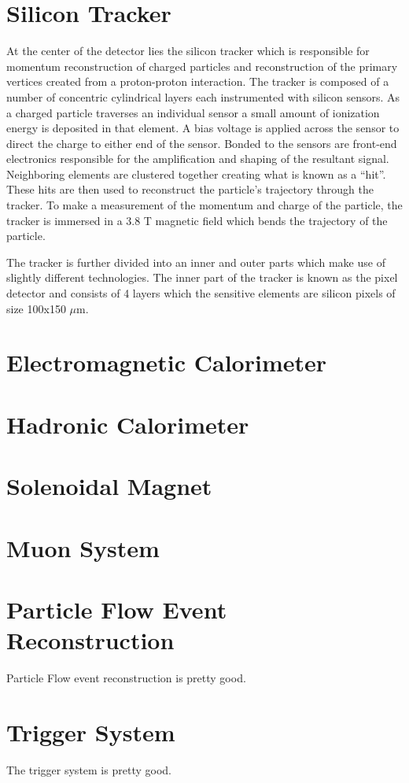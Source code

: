 \section{Silicon Tracker}
At the center of the detector lies the silicon tracker which is responsible for momentum reconstruction of charged particles and reconstruction of the primary vertices created from a proton-proton interaction. The tracker is composed of a number of concentric cylindrical layers each instrumented with silicon sensors. As a charged particle traverses an individual sensor a small amount of ionization energy is deposited in that element. A bias voltage is applied across the sensor to direct the charge to either end of the sensor. Bonded to the sensors are front-end electronics responsible for the amplification and shaping of the resultant signal. Neighboring elements are clustered together creating what is known as a ``hit''. These hits are then used to reconstruct the particle's trajectory through the tracker. To make a measurement of the momentum and charge of the particle, the tracker is immersed in a 3.8 T magnetic field which bends the trajectory of the particle.

The tracker is further divided into an inner and outer parts which make use of slightly different technologies. The inner part of the tracker is known as the pixel detector and consists of 4 layers which the sensitive elements are silicon pixels of size 100x150 $\mu$m.

\section{Electromagnetic Calorimeter}
\section{Hadronic Calorimeter}
\section{Solenoidal Magnet}
\section{Muon System}

\section{Particle Flow Event Reconstruction}
Particle Flow event reconstruction is pretty good.\cite{CMS-PRF-14-001}

\section{Trigger System}
The trigger system is pretty good.\cite{CMS-TRG-12-001}
